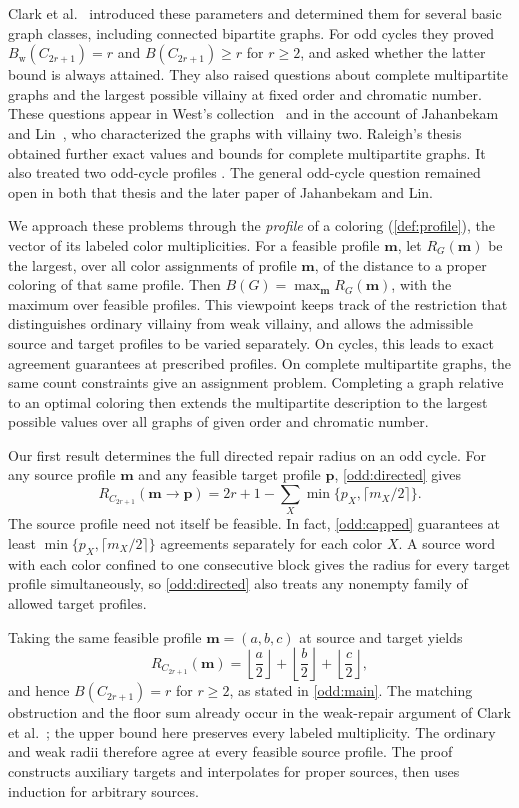 \documentclass[10pt,a4paper]{amsart}
\numberwithin{equation}{section}
\theoremstyle{definition}
\theoremstyle{remark}
\begin{document}
Clark et al.~\cite{clark2006} introduced these parameters and determined
them for several basic graph classes, including connected bipartite
graphs. For odd cycles they proved
$B_{\mathrm w}(C_{2r+1})=r$ and $B(C_{2r+1})\ge r$ for $r\ge2$,
and asked whether the latter bound is always attained. They also raised
questions about complete multipartite graphs and the largest possible
villainy at fixed order and chromatic number. These questions appear in
West's collection~\cite{west2006} and in the account of Jahanbekam and
Lin~\cite{jahanbekam2021}, who characterized the graphs with villainy
two. Raleigh's thesis~\cite{raleigh2018} obtained further exact values
and bounds for complete multipartite graphs. It also treated two odd-cycle profiles
\cite[Theorems~7 and~8]{raleigh2018}.
The general odd-cycle question remained open in both that thesis and
the later paper of Jahanbekam and Lin.

We approach these problems through the \emph{profile} of a coloring (\cref{def:profile}),
the vector of its labeled color multiplicities. For a feasible profile
$\mathbf m$, let $R_G(\mathbf m)$ be the largest, over all color assignments of
profile $\mathbf m$, of the distance to a proper coloring of that same
profile. Then $B(G)=\max_{\mathbf m}R_G(\mathbf m)$, with the maximum
over feasible profiles. This viewpoint keeps track of the restriction
that distinguishes ordinary villainy from weak villainy, and allows
the admissible source and target profiles to be varied separately.
On cycles, this leads to exact agreement guarantees at prescribed
profiles. On complete multipartite graphs, the same count constraints
give an assignment problem. Completing a graph relative to an optimal
coloring then extends the multipartite description to the largest
possible values over all graphs of given order and chromatic number.

Our first result determines the full directed repair radius on an odd
cycle. For any source profile $\mathbf m$ and any feasible target
profile $\mathbf p$, \cref{odd:directed} gives
\[
 R_{C_{2r+1}}(\mathbf m\to\mathbf p)
 =2r+1-\sum_X\min\{p_X,\lceil m_X/2\rceil\}.
\]
The source profile need not itself be feasible. In fact,
\cref{odd:capped} guarantees at least
$\min\{p_X,\lceil m_X/2\rceil\}$ agreements separately for each
color $X$. A source word with each color confined to one consecutive
block gives the radius for every
target profile simultaneously, so \cref{odd:directed} also treats any
nonempty family of allowed target profiles.

Taking the same feasible profile $\mathbf m=(a,b,c)$ at source and
target yields
\[
 R_{C_{2r+1}}(\mathbf m)
 =\left\lfloor\frac a2\right\rfloor
  +\left\lfloor\frac b2\right\rfloor
  +\left\lfloor\frac c2\right\rfloor,
\]
and hence $B(C_{2r+1})=r$ for $r\ge2$, as stated in
\cref{odd:main}. The matching obstruction and the floor sum already
occur in the weak-repair argument of
Clark et al.~\cite[Proposition~3.5]{clark2006}; the upper bound here
preserves every labeled multiplicity. The ordinary and weak radii
therefore agree at every feasible source profile. The proof constructs
auxiliary targets and interpolates for proper sources, then uses
induction for arbitrary sources.
\end{document}
